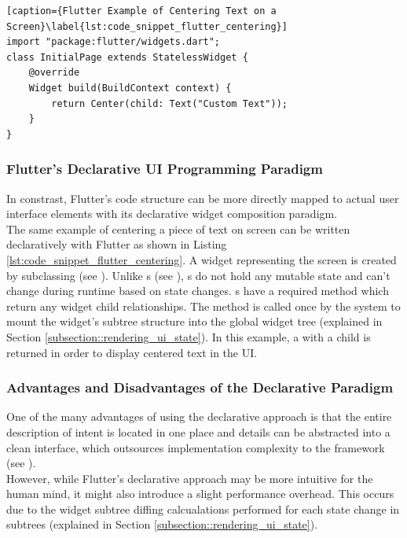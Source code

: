\begin{minipage}{\linewidth}
    \begin{lstlisting}[caption={Flutter Example of Centering Text on a Screen}\label{lst:code_snippet_flutter_centering}]
import "package:flutter/widgets.dart";
class InitialPage extends StatelessWidget {
    @override
    Widget build(BuildContext context) {
        return Center(child: Text("Custom Text"));
    }
}
    \end{lstlisting}
\end{minipage}

\subsubsection{Flutter's Declarative UI Programming Paradigm}
In constrast, Flutter's code structure can be more directly mapped to actual user interface elements with its declarative widget composition paradigm.\\
The same example of centering a piece of text on screen can be written declaratively with Flutter as shown in Listing \ref{lst:code_snippet_flutter_centering}.
A widget representing the screen is created by subclassing  (see \cite{StatelessWidgetDocumentation2021}). 
Unlike s (see \cite{StatefulWidgetDocumentation2021}), s do not hold any mutable state and can't change during runtime based on state changes. 
s have a required  method which return any widget child relationships. The method is called 
once by the system to mount the widget's subtree structure into the global widget tree (explained in Section \ref{subsection::rendering_ui_state}).
In this example, a  with a  child is returned in order to display centered text in the UI.\\

\subsubsection{Advantages and Disadvantages of the Declarative Paradigm}
One of the many advantages of using the declarative approach is that the entire description of intent is located in one place and details can be abstracted into
a clean interface, which outsources implementation complexity to the framework (see \cite{FlutterDeclarative2021}).\\
However, while Flutter's declarative approach may be more intuitive for the human mind, it might also introduce a slight performance overhead.
This occurs due to the widget subtree diffing calcualations performed for each state change in  subtrees (explained in Section \ref{subsection::rendering_ui_state}).\\

